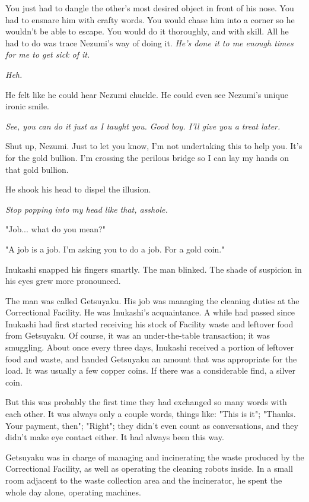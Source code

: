 You just had to dangle the other's most desired object in front of his
nose. You had to ensnare him with crafty words. You would chase him into
a corner so he wouldn't be able to escape. You would do it thoroughly,
and with skill. All he had to do was trace Nezumi's way of doing it.
\emph{He's done it to me enough times for me to get sick of it.}

\emph{Heh.}

He felt like he could hear Nezumi chuckle. He could even see Nezumi's
unique ironic smile.

\emph{See, you \emph{can} do it just as I taught you. Good boy. I'll give you a treat
later.}

Shut up, Nezumi. Just to let you know, I'm not undertaking this to help
you. It's for the gold bullion. I'm crossing the perilous bridge so I
can lay my hands on that gold bullion.

He shook his head to dispel the illusion.

\emph{Stop popping into my head like that, asshole.}

"Job... what do you mean?"

"A job is a job. I'm asking you to do a job. For a gold coin."

Inukashi snapped his fingers smartly. The man blinked. The shade of
suspicion in his eyes grew more pronounced.

The man was called Getsuyaku. His job was managing the cleaning duties
at the Correctional Facility. He was Inukashi's acquaintance. A while
had passed since Inukashi had first started receiving his stock of
Facility waste and leftover food from Getsuyaku. Of course, it was an
under-the-table transaction; it was smuggling. About once every three
days, Inukashi received a portion of leftover food and waste, and handed
Getsuyaku an amount that was appropriate for the load. It was usually a
few copper coins. If there was a considerable find, a silver coin.

But this was probably the first time they had exchanged so many words
with each other. It was always only a couple words, things like: "This
is it"; "Thanks. Your payment, then"; "Right"; they didn't even count as
conversations, and they didn't make eye contact either. It had always
been this way.

Getsuyaku was in charge of managing and incinerating the waste produced
by the Correctional Facility, as well as operating the cleaning robots
inside. In a small room adjacent to the waste collection area and the
incinerator, he spent the whole day alone, operating machines.

